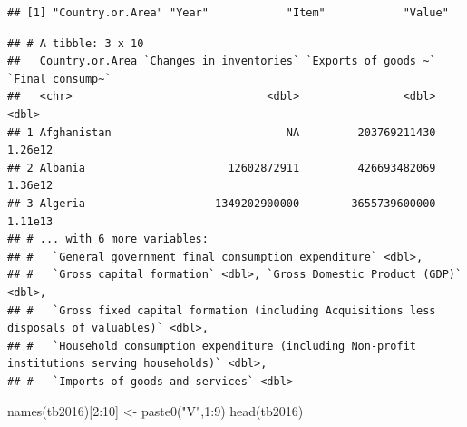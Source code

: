 \documentclass[
]{book}
\newenvironment{Shaded}{\begin{snugshade}}{\end{snugshade}}
\newcommand{\AttributeTok}[1]{\textcolor[rgb]{0.77,0.63,0.00}{#1}}
\newcommand{\CommentTok}[1]{\textcolor[rgb]{0.56,0.35,0.01}{\textit{#1}}}
\newcommand{\DecValTok}[1]{\textcolor[rgb]{0.00,0.00,0.81}{#1}}
\newcommand{\FunctionTok}[1]{\textcolor[rgb]{0.00,0.00,0.00}{#1}}
\newcommand{\NormalTok}[1]{#1}
\newcommand{\OtherTok}[1]{\textcolor[rgb]{0.56,0.35,0.01}{#1}}
\newcommand{\SpecialCharTok}[1]{\textcolor[rgb]{0.00,0.00,0.00}{#1}}
\newcommand{\StringTok}[1]{\textcolor[rgb]{0.31,0.60,0.02}{#1}}
\begin{document}
\begin{verbatim}
## [1] "Country.or.Area" "Year"            "Item"            "Value"
\end{verbatim}

\begin{Shaded}
\end{Shaded}

\begin{verbatim}
## # A tibble: 3 x 10
##   Country.or.Area `Changes in inventories` `Exports of goods ~` `Final consump~`
##   <chr>                              <dbl>                <dbl>            <dbl>
## 1 Afghanistan                           NA         203769211430          1.26e12
## 2 Albania                      12602872911         426693482069          1.36e12
## 3 Algeria                    1349202900000        3655739600000          1.11e13
## # ... with 6 more variables:
## #   `General government final consumption expenditure` <dbl>,
## #   `Gross capital formation` <dbl>, `Gross Domestic Product (GDP)` <dbl>,
## #   `Gross fixed capital formation (including Acquisitions less disposals of valuables)` <dbl>,
## #   `Household consumption expenditure (including Non-profit institutions serving households)` <dbl>,
## #   `Imports of goods and services` <dbl>
\end{verbatim}

\begin{Shaded}
\begin{Highlighting}[]
\FunctionTok{names}\NormalTok{(tb2016)[}\DecValTok{2}\SpecialCharTok{:}\DecValTok{10}\NormalTok{] }\OtherTok{\textless{}{-}} \FunctionTok{paste0}\NormalTok{(}\StringTok{"V"}\NormalTok{,}\DecValTok{1}\SpecialCharTok{:}\DecValTok{9}\NormalTok{)}
\FunctionTok{head}\NormalTok{(tb2016)}
\end{Highlighting}
\end{Shaded}
\end{document}
